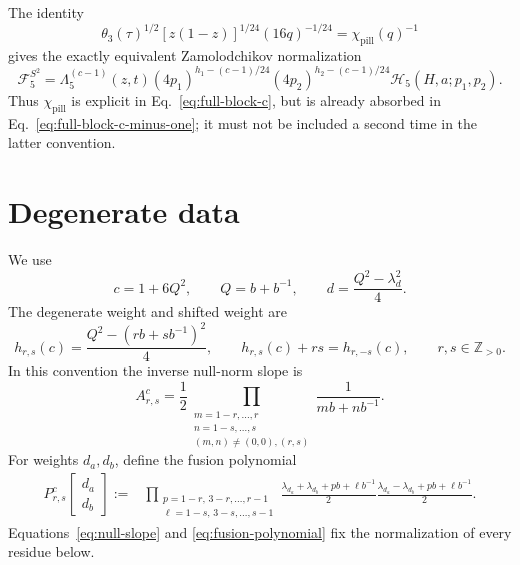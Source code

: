 \documentclass[11pt]{article}
\newcommand{\cF}{\mathcal F}
\newcommand{\cH}{\mathcal H}
\begin{document}
The identity
\begin{equation}
 \theta_3(\tau)^{1/2}[z(1-z)]^{1/24}(16q)^{-1/24}
 =\chi_{\mathrm{pill}}(q)^{-1}
 \label{eq:theta-character-identity}
\end{equation}
gives the exactly equivalent Zamolodchikov normalization
\begin{equation}
 \boxed{
 \cF^{S^2}_5
 =\Lambda_5^{(c-1)}(z,t)
 (4p_1)^{h_1-(c-1)/24}(4p_2)^{h_2-(c-1)/24}
 \cH_5(H,a;p_1,p_2).}
 \label{eq:full-block-c-minus-one}
\end{equation}
Thus $\chi_{\mathrm{pill}}$ is explicit in
Eq.~\eqref{eq:full-block-c}, but is already absorbed in
Eq.~\eqref{eq:full-block-c-minus-one}; it must not be included a second
time in the latter convention.

\section{Degenerate data}

We use
\begin{equation}
 c=1+6Q^2,\qquad Q=b+b^{-1},\qquad
 d=\frac{Q^2-\lambda_d^2}{4}.
 \label{eq:momentum-convention}
\end{equation}
The degenerate weight and shifted weight are
\begin{equation}
 h_{r,s}(c)=\frac{Q^2-(rb+s b^{-1})^2}{4},
 \qquad
 h_{r,s}(c)+rs=h_{r,-s}(c),
 \qquad r,s\in\mathbb Z_{>0}.
 \label{eq:kac-weight}
\end{equation}
In this convention the inverse null-norm slope is
\begin{equation}
 A_{r,s}^{c}
 =\frac12
 \prod_{\substack{
 m=1-r,\ldots,r\\
 n=1-s,\ldots,s\\
 (m,n)\neq(0,0),(r,s)}}
 \frac{1}{mb+n b^{-1}}.
 \label{eq:null-slope}
\end{equation}
For weights $d_a,d_b$, define the fusion polynomial
\begin{align}
 P_{r,s}^{c}\!\begin{bmatrix}d_a\\d_b\end{bmatrix}
 :={}&
 \prod_{\substack{p=1-r,\,3-r,\ldots,r-1\\
                   \ell=1-s,\,3-s,\ldots,s-1}}
 \frac{\lambda_{d_a}+\lambda_{d_b}+pb+\ell b^{-1}}{2}
 \frac{\lambda_{d_a}-\lambda_{d_b}+pb+\ell b^{-1}}{2}.
 \label{eq:fusion-polynomial}
\end{align}
Equations~\eqref{eq:null-slope} and \eqref{eq:fusion-polynomial} fix the
normalization of every residue below.
\end{document}
